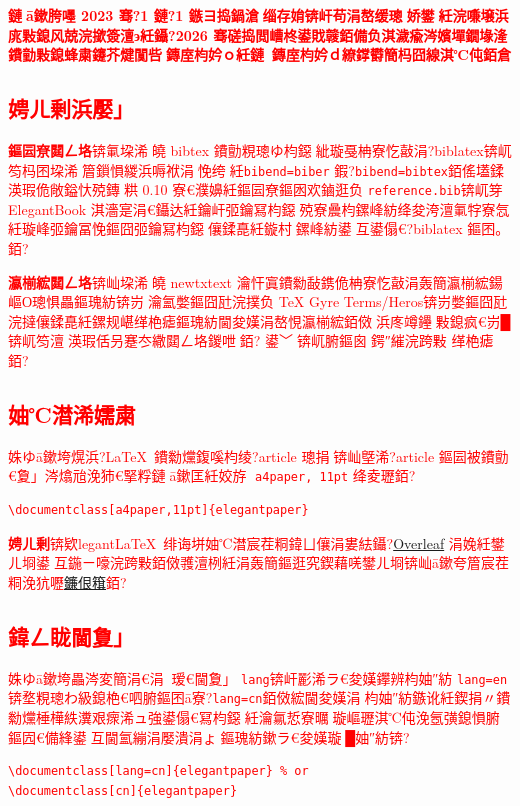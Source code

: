 ﻿\documentclass[lang=cn,a4paper,newtx]{elegantpaper}
\begin{document}
\textcolor{red}{\bfseries 鏈ā鏉胯嚜 2023 骞?1 鏈?1 鏃ヨ捣鍋滄缁存姢锛屽苟涓嶅缓璁娇鐢紝浣嗛壌浜庣敤鎴风兢浣撳簽澶э紝鑷?2026 骞磋捣閲嶆柊鍙戝竷銆備负淇濊瘉涔嬪墠鐗堟湰鐨勭敤鎴蜂粛鑳芥煡闃呰鏄庢枃妗ｏ紝鏈鏄庢枃妗ｄ繚鐣欎簡杩囧線淇℃伅銆倉

\subsection{娉ㄦ剰浜嬮」}
\textbf{鏂囩尞閮ㄥ垎}锛氭垜浠皢 bibtex 鐨勯粯璁ゆ枃鐚紪璇戞柟寮忔敼涓?biblatex锛屼笉杩囨垜浠篃鎻愪緵浜嗕袱涓悗绔紝\lstinline{bibend=biber} 鍜?\lstinline{bibend=bibtex}銆傜壒鍒渶瑕佹敞鎰忕殑鏄粠 0.10 寮€濮嬶紝鏂囩尞鏂囦欢鏀逛负 \lstinline{reference.bib}锛屼笌 ElegantBook 淇濇寔涓€鑷达紝鑰屽弬鑰冩枃鐚殑寮曟枃鏍峰紡绛夋洿澶氭牸寮忥紝璇峰弬鑰冨悗鏂囧弬鑰冩枃鐚儴鍒嗭紝鏇村鏍峰紡鍙互鍙傝€?biblatex 鏂囨。銆?

\textbf{瀛椾綋閮ㄥ垎}锛屾垜浠皢 newtxtext 瀹忓寘鐨勬敮鎸佹柟寮忔敼涓轰簡瀛椾綋鍚嶇О璁惧畾鏂瑰紡锛岃瀹氳嫳鏂囧瓧浣撲负 TeX Gyre Terms/Heros锛岃嫳鏂囧瓧浣撻儴鍒嗭紝鏍规嵁缂栬瘧鏂瑰紡閫夋嫨涓嶅悓瀛椾綋銆傚浜庝竴鑸敤鎴疯€岃█锛屼笉澶渶瑕佸叧蹇冭繖閮ㄥ垎鍐呭銆?
鍙﹀锛屼腑鏂囪鍔″繀浣跨敤  缂栬瘧銆?
\subsection{妯℃澘浠嬬粛}

姝ゆā鏉垮熀浜?\LaTeX\ 鐨勬爣鍑嗘枃绫?article 璁捐锛屾墍浠?article 鏂囩被鐨勯€夐」涔熻兘浼犻€掔粰鏈ā鏉匡紝姣斿 \lstinline{a4paper, 11pt} 绛夌瓑銆?
\begin{lstlisting}
\documentclass[a4paper,11pt]{elegantpaper}
\end{lstlisting}

\textbf{娉ㄦ剰}锛欵legant\LaTeX\ 绯诲垪妯℃澘宸茬粡鍏ㄩ儴涓婁紶鑷?\href{https://www.overleaf.com/latex/templates/elegantpaper-template/yzghrqjhmmmr}{Overleaf} 涓婏紝鐢ㄦ埛鍙互鍦ㄧ嚎浣跨敤銆傚彟澶栵紝涓轰簡鏂逛究鍥藉唴鐢ㄦ埛锛屾ā鏉夸篃宸茬粡浼犺嚦\href{https://gitee.com/ElegantLaTeX/ElegantPaper}{鐮佷簯}銆?

\subsection{鍏ㄥ眬閫夐」}
姝ゆā鏉垮畾涔変簡涓€涓瑷€閫夐」 \lstinline{lang}锛屽彲浠ラ€夋嫨鑻辨枃妯″紡 \lstinline{lang=en}锛堥粯璁わ級鎴栬€呬腑鏂囨ā寮?\lstinline{lang=cn}銆傚綋閫夋嫨涓枃妯″紡鏃讹紝鍥捐〃鐨勬爣棰樺紩瀵艰瘝浠ュ強鍙傝€冩枃鐚紝瀹氱悊寮曞璇嶇瓑淇℃伅浼氬彉鎴愪腑鏂囥€備綘鍙互閫氳繃涓嬮潰涓ょ鏂瑰紡鏉ラ€夋嫨璇█妯″紡锛?\begin{lstlisting}
\documentclass[lang=cn]{elegantpaper} % or
\documentclass[cn]{elegantpaper}
\end{lstlisting}

}
\end{document}

